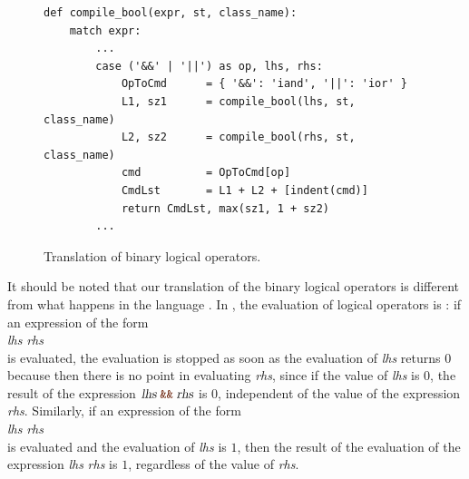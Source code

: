 \begin{figure}[!ht]
\centering
\begin{verbatim}
def compile_bool(expr, st, class_name):
    match expr:
        ...
        case ('&&' | '||') as op, lhs, rhs:
            OpToCmd      = { '&&': 'iand', '||': 'ior' }
            L1, sz1      = compile_bool(lhs, st, class_name)
            L2, sz2      = compile_bool(rhs, st, class_name)
            cmd          = OpToCmd[op]
            CmdLst       = L1 + L2 + [indent(cmd)]
            return CmdLst, max(sz1, 1 + sz2)
        ...
\end{verbatim}
\vspace*{-0.3cm}
\caption{Translation of binary logical operators.}
\label{fig:Compiler.ipynb:compile:iand}
\end{figure}

It should be noted that our translation of the binary logical operators is different from
what happens in the language .  In , the evaluation of logical operators is :
if an expression of the form
\\[0.2cm]
\hspace*{1.3cm}
\textsl{lhs} \mytt{\&\&} \textsl{rhs}
\\[0.2cm]
is evaluated, the evaluation is stopped as soon as the evaluation of \textsl{lhs}
returns $0$ because then there is no point in evaluating \textsl{rhs}, since if the value of \textsl{lhs} is $0$,
the result of the expression $\textsl{lhs} \;\mytt{\&\&}\; \textsl{rhs}$ is $0$, independent of the value of
the expression \textsl{rhs}.  Similarly, if an expression of the form 
\\[0.2cm]
\hspace*{1.3cm}
\textsl{lhs} \mytt{||} \textsl{rhs}
\\[0.2cm]
is evaluated and the evaluation of \textsl{lhs} is $1$, then the result of the evaluation of the expression
\textsl{lhs} \mytt{||} \textsl{rhs} is $1$, regardless of the value of \textsl{rhs}.

